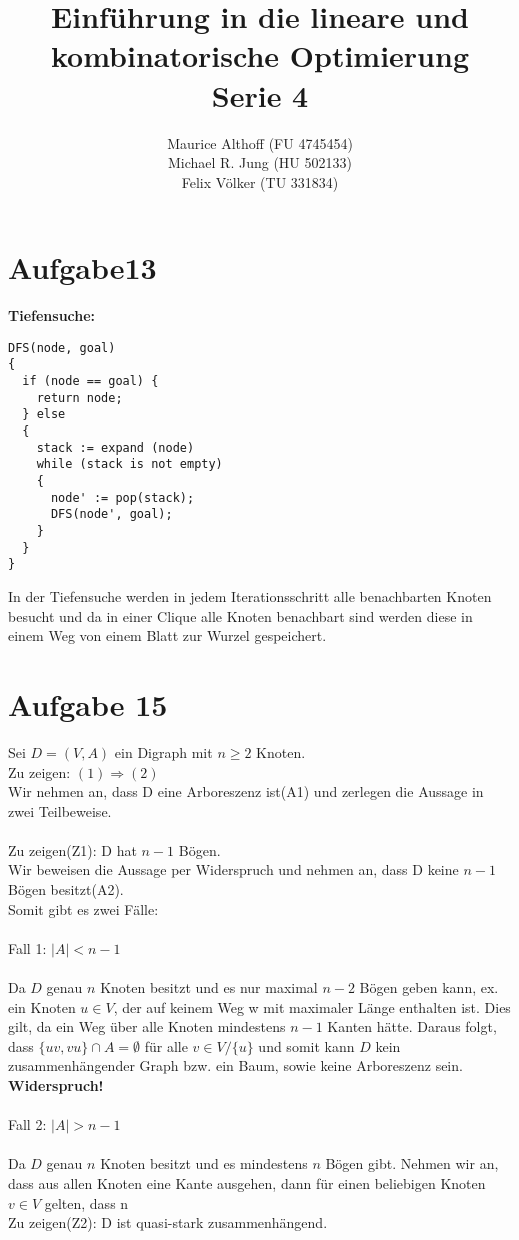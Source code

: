 \documentclass[a4paper,10pt,german]{scrartcl}
\title{Einführung in die lineare und kombinatorische Optimierung\\
Serie 4}
\author{Maurice Althoff (FU 4745454)\\Michael R. Jung (HU 502133)\\Felix Völker (TU 331834)}
\begin{document}
\maketitle

\section{Aufgabe13}

\textbf{Tiefensuche:}\\

\begin{lstlisting}
DFS(node, goal)
{
  if (node == goal) {
    return node;
  } else
  {
    stack := expand (node)
    while (stack is not empty)
    {
      node' := pop(stack);
      DFS(node', goal);
    }
  }
}
\end{lstlisting}

In der Tiefensuche werden in jedem Iterationsschritt alle benachbarten Knoten besucht und da in einer Clique alle Knoten benachbart sind werden diese in einem Weg von einem Blatt zur Wurzel gespeichert.

\section{Aufgabe 15}

Sei $D = (V,A)$ ein Digraph mit $n \ge 2$ Knoten.\\
Zu zeigen: $(1) \Rightarrow (2)$\\
Wir nehmen an, dass D eine Arboreszenz ist(A1) und zerlegen die Aussage in zwei Teilbeweise.\\
\\
Zu zeigen(Z1): D hat $n-1$ Bögen.\\ 
Wir beweisen die Aussage per Widerspruch und nehmen an, dass D keine $n-1$ Bögen besitzt(A2).\\
Somit gibt es zwei Fälle:\\
\\
Fall 1: $|A| < n - 1$\\
\\
Da $D$ genau $n$ Knoten besitzt und es nur maximal $n - 2$ Bögen geben kann, ex. ein Knoten $u \in V$, der auf keinem Weg w mit maximaler Länge enthalten ist. Dies gilt, da ein Weg über alle Knoten mindestens $n - 1$ Kanten hätte. Daraus folgt, dass $\{uv,vu\} \cap A = \emptyset$ für alle $v \in V / \{u\}$ und somit kann $D$ kein zusammenhängender Graph bzw. ein Baum, sowie keine Arboreszenz sein. \textbf{Widerspruch!}\\
\\
Fall 2: $|A| > n - 1$\\
\\
Da $D$ genau $n$ Knoten besitzt und es mindestens $n$ Bögen gibt. Nehmen wir an, dass aus allen Knoten eine Kante ausgehen, dann  für einen beliebigen Knoten $v \in V$ gelten, dass n
\\
Zu zeigen(Z2): D ist quasi-stark zusammenhängend.\\
\end{document}
